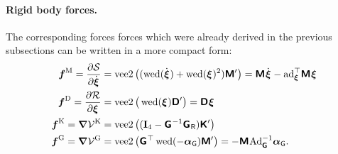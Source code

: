 \paragraph{Rigid body forces.}
The corresponding forces forces which were already derived in the previous subsections can be written in a more compact form:
\begin{subequations}
\begin{align}
 \genForceInertia = \pdiff[\accEnergy]{\bodyVeld{}{}}
 &= \veeTwoOp \big( (\wedOp(\bodyVeld{}{}) + \wedOp(\bodyVel{}{})^2) \bodyInertiaMatp{}{} \big)
 = \bodyInertiaMat{}{}\bodyVeld{}{} - \ad{\bodyVel{}{}}^\top \bodyInertiaMat{}{} \bodyVel{}{}
\\
 \genForceDiss = \pdiff[\dissFkt]{\bodyVel{}{}}
 &= \veeTwoOp \big( \wedOp(\bodyVel{}{}) \bodyDissMatp{}{} \big)
 = \bodyDissMat{}{} \bodyVel{}{}
\\
 \genForceStiff = \differential \potentialStiff
 &= \veeTwoOp \big( (\idMat[4] - \bodyHomoCoord{}{}^{-1} \bodyHomoCoordR{}{}) \bodyStiffMatp{}{} \big)
\\
 \genForceGravity = \differential\potentialGravity
 &= \veeTwoOp \big( \bodyHomoCoord{}{}^{\top} \wedOp(-\gravityAccWrench) \bodyInertiaMatp{}{} \big)
 = -\bodyInertiaMat{}{} \Ad{\G}^{-1} \gravityAccWrench.
\end{align} 
\end{subequations}

